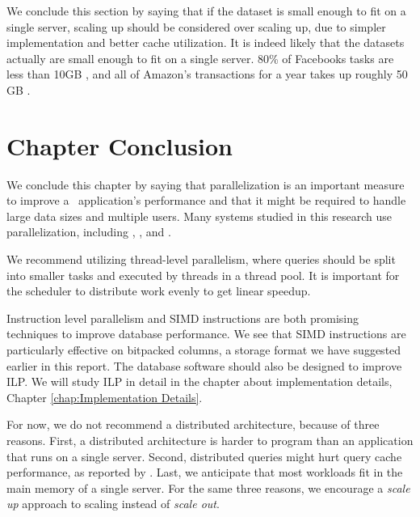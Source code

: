 We conclude this section by saying that if the dataset is small enough to fit on a single server, scaling up should be considered over scaling up, due to simpler implementation and better cache utilization. It is indeed likely that the datasets actually are small enough to fit on a single server. 80\% of Facebooks tasks are less than 10GB \cite{Mukherjee2015-ul}, and all of Amazon's transactions for a year takes up roughly 50 GB \cite{Kemper2011-ap}.

\section{Chapter Conclusion}
\label{sec:Chapter Conclusion}
We conclude this chapter by saying that parallelization is an important measure to improve a \bd~application's performance and that it might be required to handle large data sizes and multiple users. Many systems studied in this research use parallelization, including \exasol, \tableau, and \qlikview.

We recommend utilizing thread-level parallelism, where queries should be split into smaller tasks and executed by threads in a thread pool. It is important for the scheduler to distribute work evenly to get linear speedup.

Instruction level parallelism and SIMD instructions are both promising techniques to improve database performance. We see that SIMD instructions are particularly effective on bitpacked columns, a storage format we have suggested earlier in this report. The database software should also be designed to improve ILP. We will study ILP in detail in the chapter about implementation details, Chapter \ref{chap:Implementation Details}.

For now, we do not recommend a distributed architecture, because of three reasons. First, a distributed architecture is harder to program than an application that runs on a single server. Second, distributed queries might hurt query cache performance, as reported by \qlikview. Last, we anticipate that most workloads fit in the main memory of a single server. For the same three reasons, we encourage a \textit{scale up} approach to scaling instead of \textit{scale out}.
